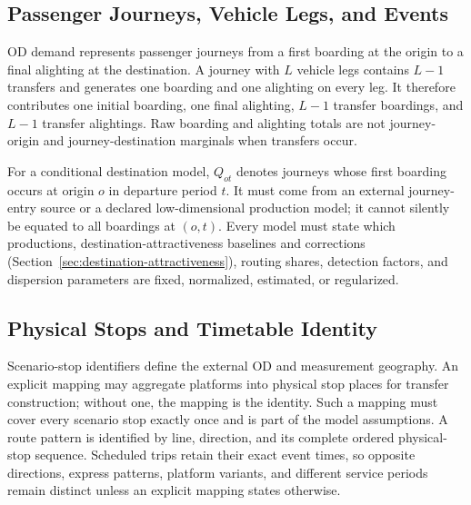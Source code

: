 




\subsection{Passenger Journeys, Vehicle Legs, and Events}

OD demand represents passenger journeys from a first boarding at the origin to
a final alighting at the destination. A journey with $L$ vehicle legs contains
$L-1$ transfers and generates one boarding and one alighting on every leg. It
therefore contributes one initial boarding, one final alighting, $L-1$ transfer
boardings, and $L-1$ transfer alightings. Raw boarding and alighting totals are
not journey-origin and journey-destination marginals when transfers occur.

For a conditional destination model, $Q_{ot}$ denotes journeys whose first
boarding occurs at origin $o$ in departure period $t$. It must come from an
external journey-entry source or a declared low-dimensional production model;
it cannot silently be equated to all boardings at $(o,t)$. Every model must
state which productions, destination-attractiveness baselines and corrections
(Section~\ref{sec:destination-attractiveness}), routing shares, detection
factors, and dispersion parameters are fixed, normalized, estimated, or
regularized.

\subsection{Physical Stops and Timetable Identity}

Scenario-stop identifiers define the external OD and measurement geography. An
explicit mapping may aggregate platforms into physical stop places for transfer
construction; without one, the mapping is the identity. Such a mapping must
cover every scenario stop exactly once and is part of the model assumptions.
A route pattern is identified by line, direction, and its complete ordered
physical-stop sequence. Scheduled trips retain their exact event times, so
opposite directions, express patterns, platform variants, and different service
periods remain distinct unless an explicit mapping states otherwise.

